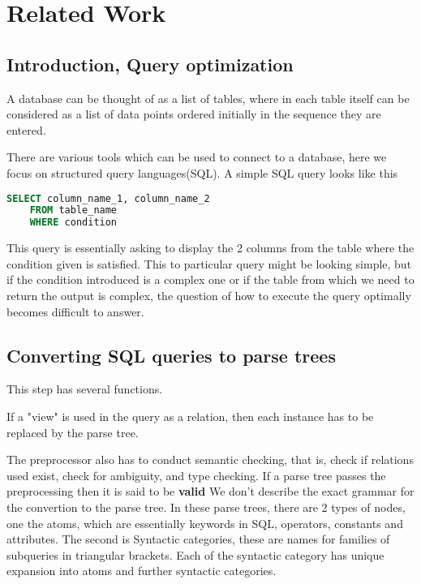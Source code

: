 \chapter{Related Work}
\label{chapter:related_work}
\thispagestyle{myheadings}

\graphicspath{{2_Body/Figures/}}

\section{Introduction, Query optimization}
A database can be thought of as a list of tables, where in each table itself can be considered as a list of data points ordered initially in the sequence they are entered.
\par There are various tools which can be used to connect to a database, here we focus on structured query languages(SQL). A simple SQL query looks like this
\begin{lstlisting}[language=SQL]
    SELECT column_name_1, column_name_2
    FROM table_name
    WHERE condition
\end{lstlisting}
This query is essentially asking to display the 2 columns from the table where the condition given is satisfied. This to particular query might be looking simple, but if the condition introduced is a complex one or if the table from which we need to return the output is complex, the question of how to execute the query optimally becomes difficult to answer.

\section{Converting SQL queries to parse trees}
This step has several functions.
\par If a "view" is used in the query as a relation, then each instance has to be replaced by the parse tree.
\par The preprocessor also has to conduct semantic checking, that is, check if relations used exist, check for ambiguity, and type checking.
If a parse tree passes the preprocessing then it is said to be \textbf{valid}
We don't describe the exact grammar for the convertion to the parse tree. In these parse trees, there are 2 types of nodes, one the atoms, which are essentially keywords in SQL, operators, constants and attributes. The second is Syntactic categories, these are names for families of subqueries in triangular brackets. Each of the syntactic category has unique expansion into atoms and further syntactic categories.



